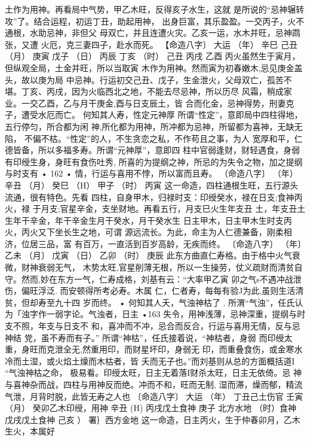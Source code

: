土作为用神。再看局中气势，甲乙木旺，反得亥子水生，这就
是所说的“忌神辗转攻”了。结合运程，初运丁丑，助起用神，
出身巨富，其乐盈盈。一交丙子，火不通根，水助忌神，非但父
母双亡，并且连遭火灾。乙亥一运，水木并旺，忌神鹉张，又遭
火厄，克三妻四子，赴水而死。
【命造八字〕 大运
（年） 辛巳 己丑
（月） 庚寅 戊子
（日） 丙辰 丁亥
（时） 己丑 丙戌
乙酉
丙火虽然生于寅月，但纵观全局，土金并旺，所以当取寅
木作为用神。然而寅为初春嫩木,忌见庚金盖头，故以庚为局
中忌神。行运初交己丑、戊子，生金泄火，父母双亡，孤苦不
堪。丁亥、丙戌，因为火临西北之地，不能去尽忌神，所以历尽
风霜，稍成家业。一交乙酉，乙与月干庚金,酉与日支辰土，皆
合而化金，忌神得势，刑妻克子，遭受水厄而亡。
何知其人寿，性定元神厚
所谓“性定”，意即局中四柱得地，五行停匀，所合都为闲
神,所化都为用神，所冲都为忌神，所留都为喜神，无缺无陷，
不偏不枯。“性定”的人，不生贪恋之私，不作苟且之事，为人
宽厚和平，仁德皆备，所以多福多寿。所谓“元神厚”，意即四
柱中官弱逢财，财轻遇食，身弱有印绶生身，身旺有食伤吐秀,
所喜的为提纲之神，所忌的为失令之物，加之提纲与时支有
• 162 •
情，行运与喜用不悖，所以富而且寿。
（命造八字〕
（年） 辛丑
（月） 癸巳
（H） 甲子
（时） 丙寅
这一命造，四柱通根生旺，五行源头流通，很有特色。先看
四柱，自身甲木，归禄时支：印绶癸水，禄在日支;食神丙火，禄
于月支;官星辛金，支坐财地。再看五行，月支巳火生年支丑
土，年支丑土生年干辛金，年干辛金生月干癸水，月干癸水生
日主甲木，日主甲木生时支丙火，丙火又下坐长生之地，可谓
源远流长。为此，命主为人仁德兼备，刚柔相济，位居三品，富
有百万，一直活到百岁高龄，无疾而终。
〔命造八字〕
（年〕 乙未
（月〕 戊寅
（日） 乙卯
（时） 庚辰
此东方曲直仁寿格。由于格中火气衰微，财神衰弱无气，
木势太旺,官星削薄无根，所以一生操劳，仗义疏财而清贫自
守。然而,妙在东方一气，仁寿成格，刘基有云：“大率甲乙寅
卯之气s不遇冲战泄伤，偏旺浮泛. 而安顿得所考必寿。木属
仁，仁者寿，每每有验J为此,虽则生活清贫，但却寿至九十四
岁而终。 •
何知其人夭，气浊神枯了 .
所渭“气浊”，任氏认为「浊字作一弱字论。气浊者，日主
•163
失令，用神浅薄，忌神深重，提纲与时支不照，年支与日支不
和，喜冲而不冲，忌合而反合，行运与喜用无情，反与忌神结
党，虽不寿而有子。” 所谓“神枯”，任氏接着说，“神枯者，身弱
而印绶太重，身旺而克泄全无,然重用印，而财星坏印，身弱无
印，而重叠食伤，或金寒水冷而土湿，或火焰土燥而木枯者，皆
夭而无子也。”而刘基则从总的方面概括道I “气浊神枯之命，
极易看。印绶太旺，日主无着落I财杀太旺，日主无依倚。忌
神与喜神杂而战，四柱与用神反而绝。冲而不和，旺而无制,
湿而滞，燥而郁，精流气泄，月背时脱，此皆无寿之人也
〔命造八字〕 大运
（年） 丁丑己土伤官 壬寅
（月） 癸卯乙木印绶，用神 辛丑
(H) 丙戌戊土食神 庚子 北方水地
（时）食神 戊戌戊土食神 己亥 ）
署｝西方金地
这一命造，日主丙火，生于仲春卯月，乙木生火，本属好
